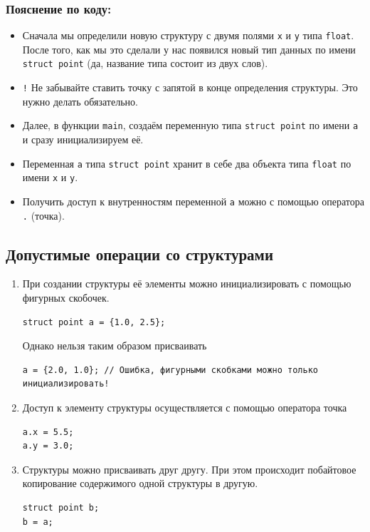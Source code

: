 \documentclass{article}
\begin{document}
\subsubsection*{Пояснение по коду:}
\begin{itemize}
\item Сначала мы определили новую структуру с двумя полями \texttt{x} и \texttt{y} типа \texttt{float}. После того, как мы это сделали у нас появился новый тип данных по имени \texttt{struct point} (да, название типа состоит из двух слов).
\item \texttt{!} Не забывайте ставить точку с запятой в конце определения структуры. Это нужно делать обязательно. 
\item Далее, в функции \texttt{main}, создаём переменную типа \texttt{struct point} по имени \texttt{a} и сразу инициализируем её.
\item Переменная \texttt{a} типа \texttt{struct point} хранит в себе два объекта типа \texttt{float} по имени \texttt{x} и \texttt{y}.
\item Получить доступ к внутренностям переменной \texttt{a} можно с помощью оператора \texttt{.} (точка).
\end{itemize}



\subsection*{Допустимые операции со структурами}
\begin{enumerate}
\item При создании структуры её элементы можно инициализировать с помощью фигурных скобочек.
\begin{lstlisting}
struct point a = {1.0, 2.5};
\end{lstlisting}
Однако нельзя таким образом присваивать
\begin{lstlisting}
a = {2.0, 1.0}; // Ошибка, фигурными скобками можно только инициализировать!
\end{lstlisting}
\item Доступ к элементу структуры осуществляется с помощью оператора точка
\begin{lstlisting}
a.x = 5.5;
a.y = 3.0;
\end{lstlisting}
\item Структуры можно присваивать друг другу. При этом происходит побайтовое копирование содержимого одной структуры в другую.
\begin{lstlisting}
struct point b;
b = a;
\end{lstlisting}
\end{enumerate}
\end{document}
